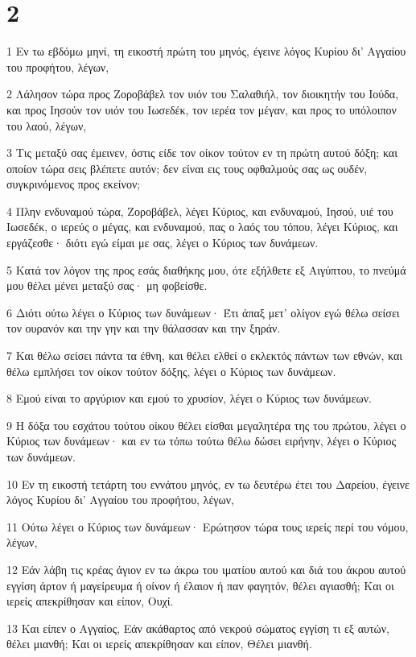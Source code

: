 \chapter{2}

\par 1 Εν τω εβδόμω μηνί, τη εικοστή πρώτη του μηνός, έγεινε λόγος Κυρίου δι' Αγγαίου του προφήτου, λέγων,
\par 2 Λάλησον τώρα προς Ζοροβάβελ τον υιόν του Σαλαθιήλ, τον διοικητήν του Ιούδα, και προς Ιησούν τον υιόν του Ιωσεδέκ, τον ιερέα τον μέγαν, και προς το υπόλοιπον του λαού, λέγων,
\par 3 Τις μεταξύ σας έμεινεν, όστις είδε τον οίκον τούτον εν τη πρώτη αυτού δόξη; και οποίον τώρα σεις βλέπετε αυτόν; δεν είναι εις τους οφθαλμούς σας ως ουδέν, συγκρινόμενος προς εκείνον;
\par 4 Πλην ενδυναμού τώρα, Ζοροβάβελ, λέγει Κύριος, και ενδυναμού, Ιησού, υιέ του Ιωσεδέκ, ο ιερεύς ο μέγας, και ενδυναμού, πας ο λαός του τόπου, λέγει Κύριος, και εργάζεσθε· διότι εγώ είμαι με σας, λέγει ο Κύριος των δυνάμεων.
\par 5 Κατά τον λόγον της προς εσάς διαθήκης μου, ότε εξήλθετε εξ Αιγύπτου, το πνεύμά μου θέλει μένει μεταξύ σας· μη φοβείσθε.
\par 6 Διότι ούτω λέγει ο Κύριος των δυνάμεων· Έτι άπαξ μετ' ολίγον εγώ θέλω σείσει τον ουρανόν και την γην και την θάλασσαν και την ξηράν.
\par 7 Και θέλω σείσει πάντα τα έθνη, και θέλει ελθεί ο εκλεκτός πάντων των εθνών, και θέλω εμπλήσει τον οίκον τούτον δόξης, λέγει ο Κύριος των δυνάμεων.
\par 8 Εμού είναι το αργύριον και εμού το χρυσίον, λέγει ο Κύριος των δυνάμεων.
\par 9 Η δόξα του εσχάτου τούτου οίκου θέλει είσθαι μεγαλητέρα της του πρώτου, λέγει ο Κύριος των δυνάμεων· και εν τω τόπω τούτω θέλω δώσει ειρήνην, λέγει ο Κύριος των δυνάμεων.
\par 10 Εν τη εικοστή τετάρτη του εννάτου μηνός, εν τω δευτέρω έτει του Δαρείου, έγεινε λόγος Κυρίου δι' Αγγαίου του προφήτου, λέγων,
\par 11 Ούτω λέγει ο Κύριος των δυνάμεων· Ερώτησον τώρα τους ιερείς περί του νόμου, λέγων,
\par 12 Εάν λάβη τις κρέας άγιον εν τω άκρω του ιματίου αυτού και διά του άκρου αυτού εγγίση άρτον ή μαγείρευμα ή οίνον ή έλαιον ή παν φαγητόν, θέλει αγιασθή; Και οι ιερείς απεκρίθησαν και είπον, Ουχί.
\par 13 Και είπεν ο Αγγαίος, Εάν ακάθαρτος από νεκρού σώματος εγγίση τι εξ αυτών, θέλει μιανθή; Και οι ιερείς απεκρίθησαν και είπον, Θέλει μιανθή.
